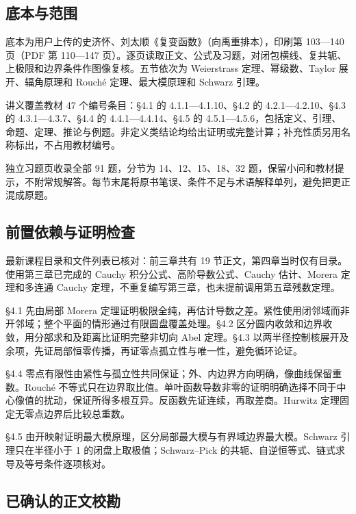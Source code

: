 \documentclass[11pt,a4paper]{article}
\begin{document}
\subsection{底本与范围}\label{ux5e95ux672cux4e0eux8303ux56f4}

底本为用户上传的史济怀、刘太顺《复变函数》（向禹重排本），印刷第
103---140 页（PDF 第 110---147
页）。逐页读取正文、公式及习题，对闭包横线、复共轭、上极限和边界条件作图像复核。五节依次为
Weierstrass 定理、幂级数、Taylor 展开、辐角原理和 Rouché
定理、最大模原理和 Schwarz 引理。

讲义覆盖教材 47 个编号条目：§4.1 的 4.1.1---4.1.10、§4.2 的
4.2.1---4.2.10、§4.3 的 4.3.1---4.3.7、§4.4 的 4.4.1---4.4.14、§4.5 的
4.5.1---4.5.6，包括定义、引理、命题、定理、推论与例题。非定义类结论均给出证明或完整计算；补充性质另用名称标出，不占用教材编号。

独立习题页收录全部 91 题，分节为 14、12、15、18、32
题，保留小问和教材提示，不附常规解答。每节末尾将原书笔误、条件不足与术语解释单列，避免把更正混成原题。

\subsection{前置依赖与证明检查}\label{ux524dux7f6eux4f9dux8d56ux4e0eux8bc1ux660eux68c0ux67e5}

最新课程目录和文件列表已核对：前三章共有 19
节正文，第四章当时仅有目录。使用第三章已完成的 Cauchy
积分公式、高阶导数公式、Cauchy 估计、Morera 定理和多连通 Cauchy
定理，不重复编写第三章，也未提前调用第五章残数定理。

§4.1 先由局部 Morera
定理证明极限全纯，再估计导数之差。紧性使用闭邻域而非开邻域；整个平面的情形通过有限圆盘覆盖处理。§4.2
区分圆内收敛和边界收敛，用分部求和及距离比证明完整非切向 Abel 定理。§4.3
以两半径控制核展开及余项，先证局部恒零传播，再证零点孤立性与唯一性，避免循环论证。

§4.4
零点有限性由紧性与孤立性共同保证；外、内边界方向明确，像曲线保留重数。Rouché
不等式只在边界取比值。单叶函数导数非零的证明明确选择不同于中心像值的扰动，保证所得多根互异。反函数先证连续，再取差商。Hurwitz
定理固定无零点边界后比较总重数。

§4.5 由开映射证明最大模原理，区分局部最大模与有界域边界最大模。Schwarz
引理只在半径小于 1 的闭盘上取极值；Schwarz--Pick
的共轭、自逆恒等式、链式求导及等号条件逐项核对。

\subsection{已确认的正文校勘}\label{ux5df2ux786eux8ba4ux7684ux6b63ux6587ux6821ux52d8}
\end{document}
